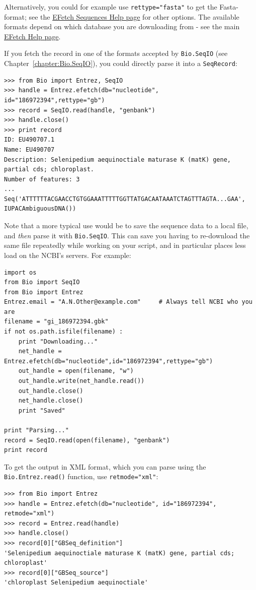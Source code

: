 \documentclass{report}
\begin{document}
Alternatively, you could for example use \verb+rettype="fasta"+ to get the Fasta-format; see the \href{http://www.ncbi.nlm.nih.gov/entrez/query/static/efetchseq\_help.html}{EFetch Sequences Help page} for other options. The available formats depend on which database you are downloading from - see the main \href{http://eutils.ncbi.nlm.nih.gov/entrez/query/static/efetch\_help.html}{EFetch Help page}.

If you fetch the record in one of the formats accepted by \verb+Bio.SeqIO+ (see Chapter~\ref{chapter:Bio.SeqIO}), you could directly parse it into a \verb+SeqRecord+:

\begin{verbatim}
>>> from Bio import Entrez, SeqIO
>>> handle = Entrez.efetch(db="nucleotide", id="186972394",rettype="gb")
>>> record = SeqIO.read(handle, "genbank")
>>> handle.close()
>>> print record
ID: EU490707.1
Name: EU490707
Description: Selenipedium aequinoctiale maturase K (matK) gene, partial cds; chloroplast.
Number of features: 3
...
Seq('ATTTTTTACGAACCTGTGGAAATTTTTGGTTATGACAATAAATCTAGTTTAGTA...GAA', IUPACAmbiguousDNA())\end{verbatim}

Note that a more typical use would be to save the sequence data to a local file, and \emph{then} parse it with \verb|Bio.SeqIO|.  This can save you having to re-download the same file repeatedly while working on your script, and in particular places less load on the NCBI's servers.  For example:

\begin{verbatim}
import os
from Bio import SeqIO
from Bio import Entrez
Entrez.email = "A.N.Other@example.com"     # Always tell NCBI who you are
filename = "gi_186972394.gbk"
if not os.path.isfile(filename) :
    print "Downloading..."
    net_handle = Entrez.efetch(db="nucleotide",id="186972394",rettype="gb")
    out_handle = open(filename, "w")
    out_handle.write(net_handle.read())
    out_handle.close()
    net_handle.close()
    print "Saved"

print "Parsing..."
record = SeqIO.read(open(filename), "genbank")
print record
\end{verbatim}

To get the output in XML format, which you can parse using the \verb+Bio.Entrez.read()+ function, use \verb+retmode="xml"+:

\begin{verbatim}
>>> from Bio import Entrez
>>> handle = Entrez.efetch(db="nucleotide", id="186972394", retmode="xml")
>>> record = Entrez.read(handle)
>>> handle.close()
>>> record[0]["GBSeq_definition"] 
'Selenipedium aequinoctiale maturase K (matK) gene, partial cds; chloroplast'
>>> record[0]["GBSeq_source"] 
'chloroplast Selenipedium aequinoctiale'
\end{verbatim}
\end{document}
